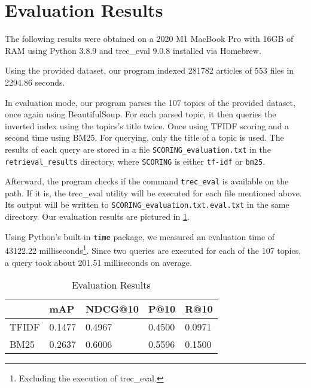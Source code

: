 \section{Evaluation Results}
\label{sec:results}

The following results were obtained on a 2020 M1 MacBook Pro with 16GB of RAM using Python 3.8.9 and trec\_eval 9.0.8 installed via Homebrew.

\medskip

Using the provided dataset, our program indexed 281782 articles of 553 files in 2294.86 seconds.

\medskip

In evaluation mode, our program parses the 107 topics of the provided dataset, once again using BeautifulSoup.
For each parsed topic, it then queries the inverted index using the topics's title twice.
Once using TFIDF scoring and a second time using BM25.
For querying, only the title of a topic is used.
The results of each query are stored in a file \verb|SCORING_evaluation.txt| in the \verb|retrieval_results| directory, where \verb|SCORING| is either \verb|tf-idf| or \verb|bm25|.

Afterward, the program checks if the command \verb|trec_eval| is available on the path.
If it is, the trec\_eval utility will be executed for each file mentioned above.
Its output will be written to \verb|SCORING_evaluation.txt.eval.txt| in the same directory.
Our evaluation results are pictured in \cref{table:results}.

Using Python's built-in \verb|time| package, we measured an evaluation time of 43122.22 milliseconds\footnote{Excluding the execution of trec\_eval.}.
Since two queries are executed for each of the 107 topics, a query took about 201.51 milliseconds on average.

\begin{table}[]
\center
\begin{tabular}{|l|l|l|l|l|}
	\hline
	      & mAP    & NDCG@10 & P@10   & R@10   \\
	\hline
	TFIDF & 0.1477 & 0.4967  & 0.4500 & 0.0971 \\
	\hline
	BM25  & 0.2637 & 0.6006  & 0.5596 & 0.1500 \\
	\hline
\end{tabular}
\caption{Evaluation Results}
\label{table:results}
\end{table}
